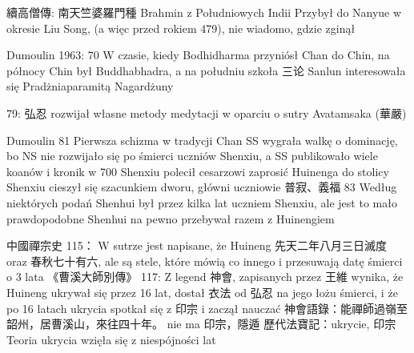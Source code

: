 續高僧傳:
南天竺婆羅門種 Brahmin z Południowych Indii
Przybył do Nanyue w okresie Liu Song, (a więc przed rokiem 479), nie wiadomo, gdzie zginął

Dumoulin 1963: 70
W czasie, kiedy Bodhidharma przyniósł Chan do Chin, na północy Chin był Buddhabhadra, a na południu szkoła 三论
Sanlun interesowała się Pradżniaparamitą Nagardżuny

79: 弘忍 rozwijał własne metody medytacji w oparciu o sutry Avatamsaka (華嚴)

Dumoulin 81
Pierwsza schizma w tradycji Chan
SS wygrała walkę o dominację, bo NS nie rozwijało się po śmierci uczniów Shenxiu, a SS publikowało wiele koanów i kronik
w 700 Shenxiu polecił cesarzowi zaprosić Huinenga do stolicy
Shenxiu cieszył się szacunkiem dworu, główni uczniowie 普寂、義福
83
Według niektórych podań Shenhui był przez kilka lat uczniem Shenxiu, ale jest to mało prawdopodobne
Shenhui na pewno przebywał razem z Huinengiem

中國禪宗史 115：
W sutrze jest napisane, że Huineng 先天二年八月三日滅度 oraz 春秋七十有六, ale są stele, które mówią co innego i przesuwają datę śmierci o 3 lata
《曹溪大師別傳》
117: Z legend 神會, zapisanych przez 王維 wynika, że Huineng ukrywał się przez 16 lat, dostał 衣法 od 弘忍 na jego łożu śmierci, i że po 16 latach ukrycia spotkał się z 印宗 i zaczął nauczać
神會語錄：能禪師過嶺至韶州，居曹溪山，來往四十年。 nie ma 印宗，隱遁
歷代法寶記：ukrycie, 印宗
Teoria ukrycia wzięła się z niespójności lat
\fi

